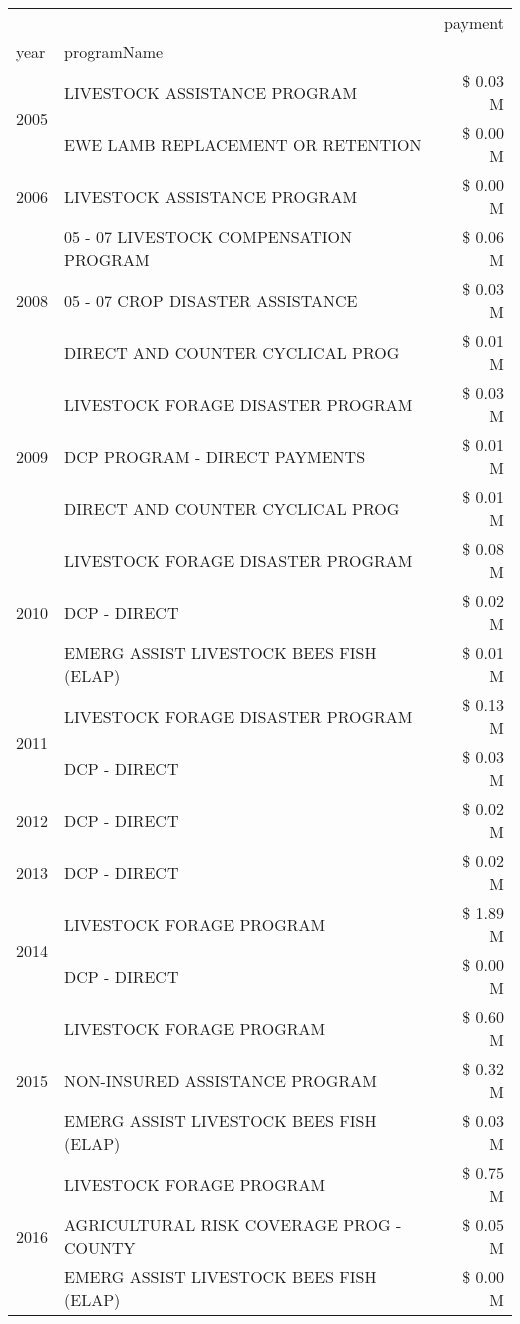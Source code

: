 \begin{tabular}{llr}
\toprule
 &  & payment \\
year & programName &  \\
\midrule
\multirow[t]{2}{*}{2005} & LIVESTOCK ASSISTANCE PROGRAM & \$ 0.03 M \\
 & EWE LAMB REPLACEMENT OR RETENTION & \$ 0.00 M \\
\cline{1-3}
2006 & LIVESTOCK ASSISTANCE PROGRAM & \$ 0.00 M \\
\cline{1-3}
\multirow[t]{3}{*}{2008} & 05 - 07 LIVESTOCK COMPENSATION PROGRAM & \$ 0.06 M \\
 & 05 - 07 CROP DISASTER ASSISTANCE & \$ 0.03 M \\
 & DIRECT AND COUNTER CYCLICAL PROG & \$ 0.01 M \\
\cline{1-3}
\multirow[t]{3}{*}{2009} & LIVESTOCK FORAGE DISASTER  PROGRAM & \$ 0.03 M \\
 & DCP PROGRAM - DIRECT PAYMENTS & \$ 0.01 M \\
 & DIRECT AND COUNTER CYCLICAL PROG & \$ 0.01 M \\
\cline{1-3}
\multirow[t]{3}{*}{2010} & LIVESTOCK FORAGE DISASTER PROGRAM & \$ 0.08 M \\
 & DCP - DIRECT & \$ 0.02 M \\
 & EMERG ASSIST LIVESTOCK BEES FISH (ELAP) & \$ 0.01 M \\
\cline{1-3}
\multirow[t]{2}{*}{2011} & LIVESTOCK FORAGE DISASTER PROGRAM & \$ 0.13 M \\
 & DCP - DIRECT & \$ 0.03 M \\
\cline{1-3}
2012 & DCP - DIRECT & \$ 0.02 M \\
\cline{1-3}
2013 & DCP - DIRECT & \$ 0.02 M \\
\cline{1-3}
\multirow[t]{2}{*}{2014} & LIVESTOCK FORAGE PROGRAM & \$ 1.89 M \\
 & DCP - DIRECT & \$ 0.00 M \\
\cline{1-3}
\multirow[t]{3}{*}{2015} & LIVESTOCK FORAGE PROGRAM & \$ 0.60 M \\
 & NON-INSURED ASSISTANCE PROGRAM & \$ 0.32 M \\
 & EMERG ASSIST LIVESTOCK BEES FISH (ELAP) & \$ 0.03 M \\
\cline{1-3}
\multirow[t]{3}{*}{2016} & LIVESTOCK FORAGE PROGRAM & \$ 0.75 M \\
 & AGRICULTURAL RISK COVERAGE PROG - COUNTY & \$ 0.05 M \\
 & EMERG ASSIST LIVESTOCK BEES FISH (ELAP) & \$ 0.00 M \\

\end{tabular}

